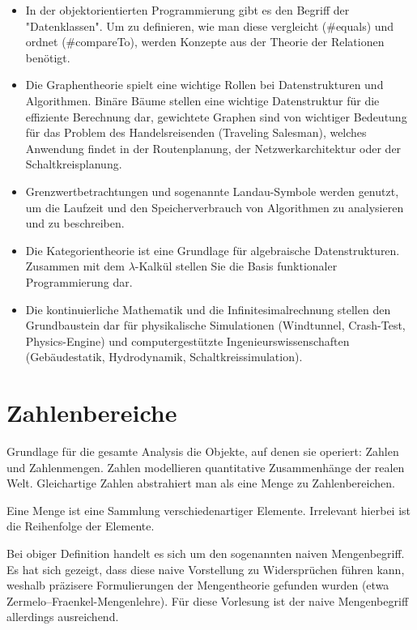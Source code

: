 \begin{itemize}
	\item In der objektorientierten Programmierung gibt es den Begriff der "Datenklassen". Um zu definieren, wie man diese vergleicht (\#equals) und ordnet (\#compareTo), werden Konzepte aus der Theorie der Relationen benötigt.
	\item Die Graphentheorie spielt eine wichtige Rollen bei Datenstrukturen und Algorithmen. Binäre Bäume stellen eine wichtige Datenstruktur für die effiziente Berechnung dar, gewichtete Graphen sind von wichtiger Bedeutung für das Problem des Handelsreisenden (Traveling Salesman), welches Anwendung findet in der Routenplanung, der Netzwerkarchitektur oder der Schaltkreisplanung.
	\item Grenzwertbetrachtungen und sogenannte Landau-Symbole werden genutzt, um die Laufzeit und den Speicherverbrauch von Algorithmen zu analysieren und zu beschreiben.
	\item Die Kategorientheorie ist eine Grundlage für algebraische Datenstrukturen. Zusammen mit dem $\lambda$-Kalkül stellen Sie die Basis funktionaler Programmierung dar.
	\item Die kontinuierliche Mathematik und die Infinitesimalrechnung stellen den Grundbaustein dar für physikalische Simulationen (Windtunnel, Crash-Test, Physics-Engine) und computergestützte Ingenieurswissenschaften (Gebäudestatik, Hydrodynamik, Schaltkreissimulation).
\end{itemize}

\section{Zahlenbereiche}

Grundlage für die gesamte Analysis die Objekte, auf denen sie operiert: Zahlen und Zahlenmengen. Zahlen modellieren quantitative Zusammenhänge der realen Welt. Gleichartige Zahlen abstrahiert man als eine Menge zu Zahlenbereichen.


\begin{definition}[Menge]
	Eine Menge ist eine Sammlung verschiedenartiger Elemente. Irrelevant hierbei ist die Reihenfolge der Elemente.
\end{definition}

Bei obiger Definition handelt es sich um den sogenannten naiven Mengenbegriff. Es hat sich gezeigt, dass diese naive Vorstellung zu Widersprüchen führen kann,
weshalb präzisere Formulierungen der Mengentheorie gefunden wurden (etwa Zermelo–Fraenkel-Mengenlehre). Für diese Vorlesung ist der naive Mengenbegriff allerdings
ausreichend.

